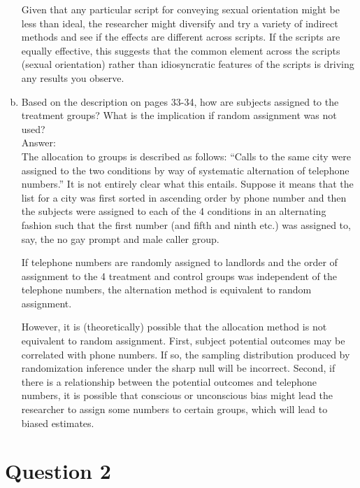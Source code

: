\documentclass[11pt,notitlepage]{article}\usepackage[]{graphicx}\usepackage[]{color}
\makeatletter
\newenvironment{kframe}{%
 \def\at@end@of@kframe{}%
 \ifinner\ifhmode%
  \def\at@end@of@kframe{\end{minipage}}%
  \begin{minipage}{\columnwidth}%
 \fi\fi%
 \def\FrameCommand##1{\hskip\@totalleftmargin \hskip-\fboxsep
 \colorbox{shadecolor}{##1}\hskip-\fboxsep
     \hskip-\linewidth \hskip-\@totalleftmargin \hskip\columnwidth}%
 \MakeFramed {\advance\hsize-\width
   \@totalleftmargin\z@ \linewidth\hsize
   \@setminipage}}%
 {\par\unskip\endMakeFramed%
 \at@end@of@kframe}
\newenvironment{knitrout}{}{} %
\makeatother
\begin{document}
\begin{enumerate}[a)]
Given that any particular script for conveying sexual orientation might be less than ideal, the researcher might diversify and try a variety of indirect methods and see if the effects are different across scripts. If the scripts are equally effective, this suggests that the common element across the scripts (sexual orientation) rather than idiosyncratic features of the scripts is driving any results you observe.  

\item Based on the description on pages 33-34, how are subjects assigned to the treatment groups? What is the implication if random assignment was not used?\\
Answer:\\
The allocation to groups is described as follows: ``Calls to the same city were assigned to the two conditions by way of systematic alternation of telephone numbers.'' It is not entirely clear what this entails. Suppose it means that the list for a city was first sorted in ascending order by phone number and then the subjects were assigned to each of the 4 conditions in an alternating fashion such that the first number (and fifth and ninth etc.) was assigned to, say, the no gay prompt and male caller group. 

If telephone numbers are randomly assigned to landlords and the order of assignment to the 4 treatment and control groups was independent of the telephone numbers, the alternation method is equivalent to random assignment. 

However, it is (theoretically) possible that the allocation method is not equivalent to random assignment. First, subject potential outcomes may be correlated with phone numbers.  If so, the sampling distribution produced by randomization inference under the sharp null will be incorrect. Second, if there is a relationship between the potential outcomes and telephone numbers, it is possible that conscious or unconscious bias might lead the researcher to assign some  numbers to certain groups, which will lead to biased estimates. 

\end{enumerate}

\section*{Question 2}
\begin{knitrout}
\color{fgcolor}\begin{kframe}
\begin{verbatim}






\end{verbatim}
\end{kframe}
\end{knitrout}
\end{document}

